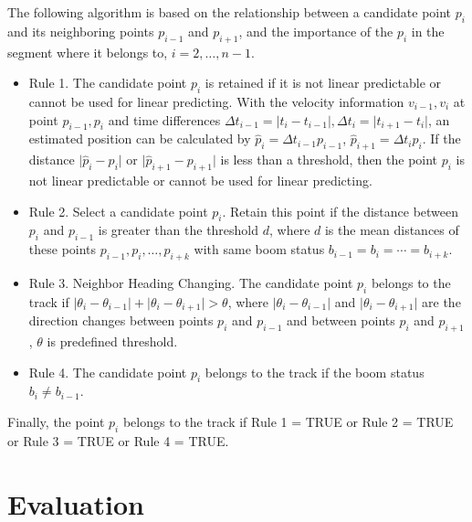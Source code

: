 The following algorithm is based on the relationship between a candidate point $p_i$ and its neighboring points $p_{i-1}$ and $p_{i+1}$, and the importance of the $p_i$ in the segment where it belongs to, $i=2,\ldots,n-1$. 

\begin{itemize}\itemsep0em
\item Rule 1. The candidate point $p_i$ is retained if it is not linear predictable or cannot be used for linear predicting. With the velocity information $v_{i-1}, v_i$ at point $p_{i-1}, p_i$ and time differences $\Delta t_{i-1} = \lvert t_{i}-t_{i-1} \rvert,\Delta t_{i} = \lvert t_{i+1}-t_{i}\rvert$, an estimated position can be calculated by $\hat{p}_i=\Delta t_{i-1} p_{i-1}$, $\hat{p}_{i+1}=\Delta t_{i} p_{i}$. If the distance $\lvert \hat{p}_i-p_i\rvert$ or $\lvert \hat{p}_{i+1}-p_{i+1}\rvert$ is less than a threshold, then the point $p_i$ is not linear predictable or cannot be used for linear predicting.

\item Rule 2. Select a candidate point $p_i$. Retain this point if the distance between $p_i$ and $p_{i-1}$ is greater than the threshold $d$, where $d$ is the mean distances of these points $p_{i-1}, p_i, \ldots, p_{i+k}$ with same boom status $b_{i-1}=b_i=\cdots=b_{i+k}$. 

\item Rule 3. Neighbor Heading Changing. The candidate point $p_i$ belongs to the track if $\lvert \theta_i-\theta_{i-1}\rvert  + \lvert \theta_i-\theta_{i+1}\rvert >\theta$, where $\lvert \theta_i-\theta_{i-1}\rvert$ and $ \lvert \theta_i-\theta_{i+1}\rvert $ are the direction changes between points $p_i$ and $p_{i-1}$ and between points $p_i$ and $p_{i+1}$, $\theta$ is predefined threshold.

\item Rule 4. The candidate point $p_i$ belongs to the track if the boom status $b_i\neq b_{i-1}$.
\end{itemize}

Finally, the point $p_i$ belongs to the track if Rule 1 = TRUE or Rule 2 = TRUE or Rule 3 = TRUE or Rule 4 = TRUE.


\section{Evaluation}

